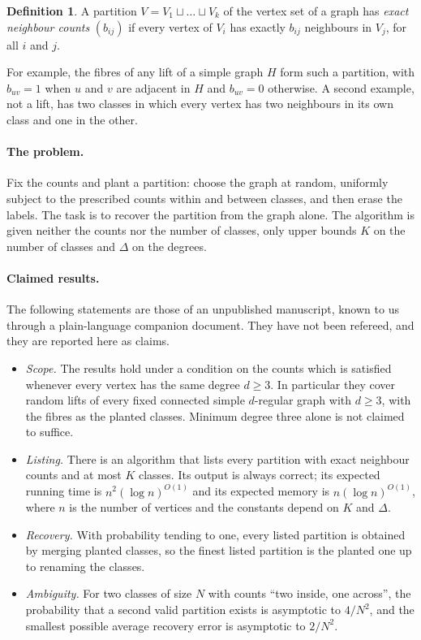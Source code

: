 \documentclass[11pt,letterpaper]{article}
\theoremstyle{definition}
\newtheorem{definition}[theorem]{Definition}
\theoremstyle{remark}
\begin{document}
\begin{definition}
A partition $V=V_1\sqcup\dots\sqcup V_k$ of the vertex set of a graph has \emph{exact neighbour
counts} $(b_{ij})$ if every vertex of $V_i$ has exactly $b_{ij}$ neighbours in $V_j$, for all
$i$ and $j$.
\end{definition}

For example, the fibres of any lift of a simple graph $H$ form such a partition, with $b_{uv}=1$
when $u$ and $v$ are adjacent in $H$ and $b_{uv}=0$ otherwise. A second example, not a lift, has
two classes in which every vertex has two neighbours in its own class and one in the other.

\paragraph{The problem.}
Fix the counts and plant a partition: choose the graph at random, uniformly subject to the
prescribed counts within and between classes, and then erase the labels. The task is to recover
the partition from the graph alone. The algorithm is given neither the counts nor the number of
classes, only upper bounds $K$ on the number of classes and $\Delta$ on the degrees.

\paragraph{Claimed results.}
The following statements are those of an unpublished manuscript, known to us through a
plain-language companion document. They have not been refereed, and they are reported here as
claims.
\begin{itemize}
  \item \emph{Scope.} The results hold under a condition on the counts which is satisfied whenever
  every vertex has the same degree $d\ge3$. In particular they cover random lifts of every fixed
  connected simple $d$-regular graph with $d\ge3$, with the fibres as the planted classes.
  Minimum degree three alone is not claimed to suffice.
  \item \emph{Listing.} There is an algorithm that lists every partition with exact neighbour
  counts and at most $K$ classes. Its output is always correct; its expected running time is
  $n^2(\log n)^{O(1)}$ and its expected memory is $n(\log n)^{O(1)}$, where $n$ is the number of
  vertices and the constants depend on $K$ and $\Delta$.
  \item \emph{Recovery.} With probability tending to one, every listed partition is obtained by
  merging planted classes, so the finest listed partition is the planted one up to renaming the
  classes.
  \item \emph{Ambiguity.} For two classes of size $N$ with counts ``two inside, one across'', the
  probability that a second valid partition exists is asymptotic to $4/N^2$, and the smallest
  possible average recovery error is asymptotic to $2/N^2$.
\end{itemize}
\end{document}
